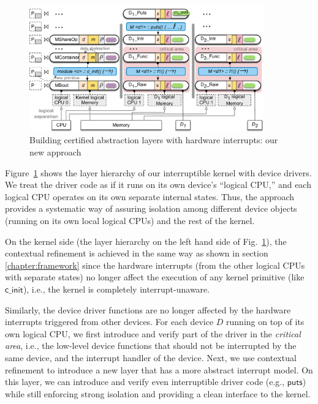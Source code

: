 \begin{figure}
	\begin{center}
	  \includegraphics[width=0.90\textwidth]{figs/layer_new}
	\end{center}
	\caption{Building certified abstraction layers with hardware interrupts: our new approach}
	\label{fig:layer_new}
\end{figure}


Figure~\ref{fig:layer_new} shows the layer hierarchy of our
interruptible kernel with device drivers.  We treat the driver code as
if it runs on its own device's ``logical CPU,'' and each logical CPU
operates on its own separate internal states. Thus, the approach
provides a systematic way of assuring isolation among different device
objects (running on its own local logical CPUs) and the rest of the kernel.

On the kernel side (the layer hierarchy on the left hand side of
Fig.~\ref{fig:layer_new}), the contextual refinement is achieved in
the same way as shown in section \ref{chapter:framework} since the hardware interrupts (from
the other logical CPUs with separate states) no longer affect the
execution of any kernel primitive (like $\textsf{c\_init}$), i.e., the
kernel is completely interrupt-unaware.

Similarly, the device driver functions are no longer affected by the
hardware interrupts triggered from other devices.  For each device $D$
running on top of its own logical CPU, we first introduce and verify
part of the driver in the {\em critical area}, i.e., the low-level
device functions that should not be interrupted by the same device,
and the interrupt handler of the device.  Next, we use contextual
refinement to introduce a new layer that has a more abstract interrupt
model. On this layer, we can introduce and verify even interruptible
driver code (e.g., $\textsf{puts}$) while still enforcing strong
isolation and providing a clean interface to the kernel.

